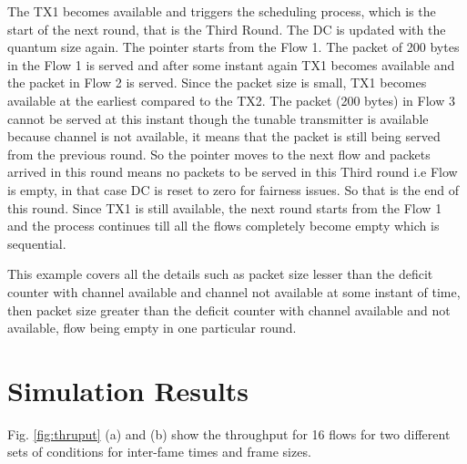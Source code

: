 \documentclass[conference,letterpaper]{IEEEtran}
\begin{document}
The TX1 becomes available and triggers the scheduling process, which is the
start of the next round, that is the Third Round. The DC is updated with the
quantum size again. The pointer starts from the Flow 1. The packet of 200 bytes
in the Flow 1 is served and after some instant again TX1 becomes available and
the packet in Flow 2 is served. Since the packet size is small, TX1 becomes
available at the earliest compared to the TX2. The packet (200 bytes) in Flow 3
cannot be served at this instant though the tunable transmitter is available
because channel is not available, it means that the packet is still being served
from the previous round. So the pointer moves to the next flow and packets
arrived in this round means no packets to be served in this Third round i.e Flow
is empty, in that case DC is reset to zero for fairness issues. So that is the
end of this round. Since TX1 is still available, the next round starts from the
Flow 1 and the process continues till all the flows completely become empty
which is sequential.

This example covers all the details such as packet size lesser than the deficit
counter with channel available and channel not available at some instant of
time, then packet size greater than the deficit counter with channel available
and not available, flow being empty in one particular round.









\section{Simulation Results}

Fig. \ref{fig:thruput} (a) and (b) show the throughput for 16 flows for two
different sets of conditions for inter-fame times and frame sizes.
\end{document}
